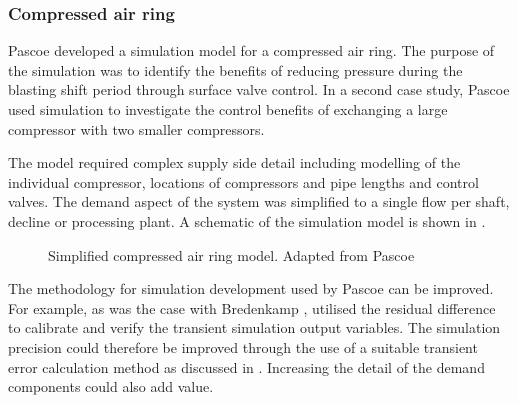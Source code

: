 \subsubsection{Compressed air ring}
Pascoe \cite{Pascoe2016Masters} developed a simulation model for a compressed air ring. The purpose of the simulation was to identify the benefits of reducing pressure during the blasting shift period through surface valve control. In a second case study, Pascoe used simulation to investigate the control benefits of exchanging a large compressor with two smaller compressors.
\par 
 The model required complex supply side detail including modelling of the individual compressor, locations of compressors and pipe lengths and control valves. The demand aspect of the system was simplified to a single flow per shaft, decline or processing plant. A schematic of the simulation model is shown in .
 \par
\begin{figure}[h!]
	\centering
	\caption[Simplified compressed air ring model]{Simplified compressed air ring model. Adapted from Pascoe \cite{Pascoe2016Masters}}
	\label{fig:Pascoe model}
\end{figure}
The methodology for simulation development used by Pascoe can be improved. For example, as was the case with Bredenkamp \cite{Bredenkamp2013Masters}, \cite{Pascoe2016Masters} utilised the residual difference to calibrate and verify the transient simulation output variables. The simulation precision could therefore be improved through the use of a suitable transient error calculation method as discussed in . Increasing the detail of the demand components could also add value.

